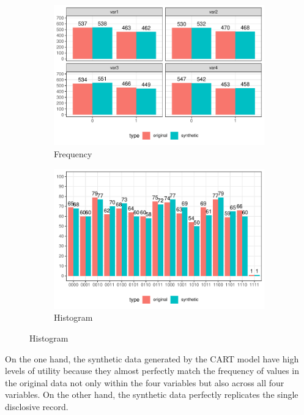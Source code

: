 \documentclass[a4paper,11pt]{style/uneceart}
\begin{document}
\begin{figure}[!h]
    \centering
    \caption{Compare original and synthetic data}
    \begin{subfigure}{0.48\textwidth}
        \includegraphics[width=\textwidth]{../graphs/graph_cart_frequency_compare.pdf}
        \caption{Frequency}
        \label{fig:frequency_compare}
    \end{subfigure}
    \hfill
    \begin{subfigure}{0.48\textwidth}
        \includegraphics[width=\textwidth]{../graphs/graph_cart_histogram_compare.pdf}
        \caption{Histogram}
        \label{fig:histogram_compare}
    \end{subfigure}
    \label{fig:compare}
\end{figure}

On the one hand, the synthetic data generated by the CART model have high levels of utility because they almost perfectly match the frequency of values in the original data not only within the four variables but also across all four variables.  On the other hand, the synthetic data perfectly replicates the single disclosive record.
\end{document}
